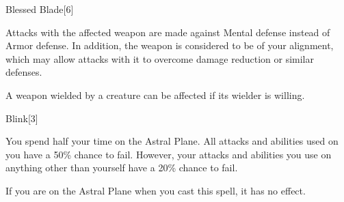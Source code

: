 \begin{spellsection}{Blessed Blade}[6]
    \begin{spellheader}
    \end{spellheader}
    \begin{spellcontent}
        \begin{spelltargetinginfo}
        \end{spelltargetinginfo}
        \begin{spelleffects}
            \spelleffect Attacks with the affected weapon are made against Mental defense instead of Armor defense.
            In addition, the weapon is considered to be of your alignment, which may allow attacks with it to overcome damage reduction or similar defenses.
        \end{spelleffects}
    \end{spellcontent}
    \begin{spellfooter}
        \spellnotes A weapon wielded by a creature can be affected if its wielder is willing.
        \miscastexplode
    \end{spellfooter}
\end{spellsection}

\begin{spellsection}{Blink}[3]
    \begin{spellheader}
    \end{spellheader}
    \begin{spellcontent}
        \begin{spelltargetinginfo}
        \end{spelltargetinginfo}
        \begin{spelleffects}
            \spelleffect You spend half your time on the Astral Plane.
            All attacks and abilities used on you have a 50\% chance to fail.
            However, your attacks and abilities you use on anything other than yourself have a 20\% chance to fail.
            \spelldur \durshort \dismissable
        \end{spelleffects}
    \end{spellcontent}
    \begin{spellfooter}
        \spellnotes If you are on the Astral Plane when you cast this spell, it has no effect.
        \miscastexplode
    \end{spellfooter}
    \begin{spellaugments}
    \end{spellaugments}
\end{spellsection}

